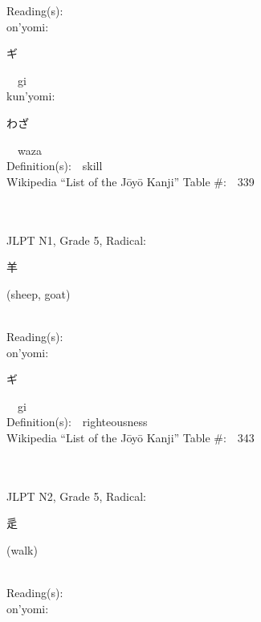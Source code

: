 \begin{multicols}{2}
Reading(s):\ \ \\
{\hspace*{1em}}on'yomi:\ \ \\
{\hspace*{2em}}{\begin{CJK}{UTF8}{min} ギ \end{CJK}}\ \ gi\ \ \\
{\hspace*{1em}}kun'yomi:\ \ \\
{\hspace*{2em}}{\begin{CJK}{UTF8}{min} わざ \end{CJK}}\ \ waza\ \ \\
Definition(s):\ \ skill \\
Wikipedia ``List of the J\=oy\=o Kanji'' Table \#:\ \ 339 \\
\ \ \\
{\fontsize{34pt}{40pt}  }\ \ \\  %
{JLPT N1, Grade 5, Radical:\ \ {\begin{CJK}{UTF8}{min} 羊 \end{CJK}} (sheep, goat) } \\
Reading(s):\ \ \\
{\hspace*{1em}}on'yomi:\ \ \\
{\hspace*{2em}}{\begin{CJK}{UTF8}{min} ギ \end{CJK}}\ \ gi\ \ \\
Definition(s):\ \ righteousness \\
Wikipedia ``List of the J\=oy\=o Kanji'' Table \#:\ \ 343 \\
\ \ \\
{\fontsize{34pt}{40pt}  }\ \ \\  %
{JLPT N2, Grade 5, Radical:\ \ {\begin{CJK}{UTF8}{min} 辵 \end{CJK}} (walk) } \\
Reading(s):\ \ \\
{\hspace*{1em}}on'yomi:\ \ \\

\end{multicols}
